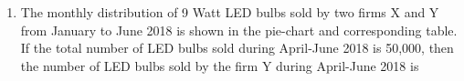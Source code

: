 \documentclass[journal,12pt,onecolumn]{IEEEtran}
\theoremstyle{remark}
\begin{document}
\begin{enumerate}
    \item The monthly distribution of 9 Watt LED bulbs sold by two firms X and Y from January to June 2018 is shown in the pie-chart and corresponding table. If the total number of LED bulbs sold during April-June 2018 is 50,000, then the number of LED bulbs sold by the firm Y during April-June 2018 is {\underline{\hspace{2cm}}}
     \begin{table}[H]
        \centering
    \end{table}
\begin{figure}[H]
        \centering
    \end{figure}


\end{enumerate}
\end{document}

